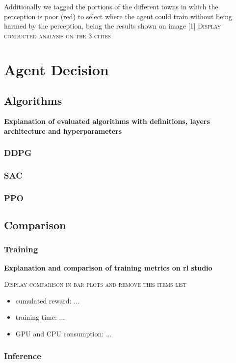 \documentclass[conference]{IEEEtran}
\begin{document}
Additionally we tagged the portions of the different towns in which the perception is poor (red) to select where the agent could train without being harmed by the perception, being the results shown on image [1] \textsc{Display conducted analysis on the 3 cities}
 
\section{Agent Decision}

\subsection{Algorithms}

\textbf{Explanation of evaluated algorithms with definitions, layers architecture and hyperparameters}

\subsubsection{DDPG}
\subsubsection{SAC}
\subsubsection{PPO}

\subsection{Comparison}
\subsubsection{Training}

\textbf{Explanation and comparison of training metrics on rl studio}

\textsc{Display comparison in bar plots and remove this items list}
\begin{itemize}
    \item cumulated reward: ...
    \item training time: ...
    \item GPU and CPU consumption: ...
\end{itemize}

\subsubsection{Inference}
\end{document}
